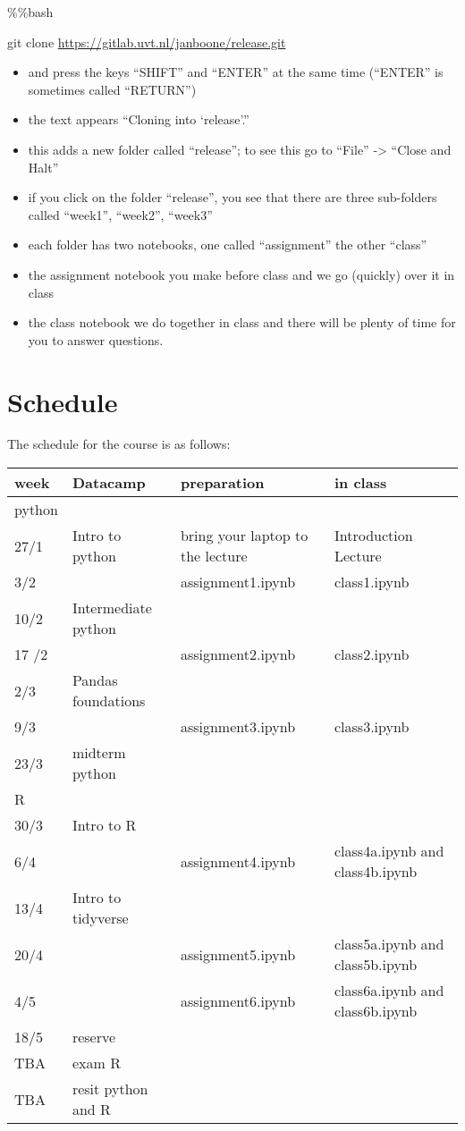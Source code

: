 \documentclass[]{book}
\providecommand{\tightlist}{%
  \setlength{\itemsep}{0pt}\setlength{\parskip}{0pt}}
\begin{document}
\%\%bash

git clone \url{https://gitlab.uvt.nl/janboone/release.git}

\begin{itemize}
\tightlist
\item
  and press the keys ``SHIFT'' and ``ENTER'' at the same time (``ENTER''
  is sometimes called ``RETURN'')
\item
  the text appears ``Cloning into `release'.''
\item
  this adds a new folder called ``release''; to see this go to ``File''
  -\textgreater{} ``Close and Halt''
\item
  if you click on the folder ``release'', you see that there are three
  sub-folders called ``week1'', ``week2'', ``week3''
\item
  each folder has two notebooks, one called ``assignment'' the other
  ``class''
\item
  the assignment notebook you make before class and we go (quickly) over
  it in class
\item
  the class notebook we do together in class and there will be plenty of
  time for you to answer questions.
\end{itemize}

\section{Schedule}\label{schedule-1}

The schedule for the course is as follows:

\begin{longtable}[]{@{}llll@{}}
\toprule
week & Datacamp & preparation & in class\tabularnewline
\midrule
\endhead
python & & &\tabularnewline
27/1 & Intro to python & bring your laptop to the lecture & Introduction
Lecture\tabularnewline
3/2 & & assignment1.ipynb & class1.ipynb\tabularnewline
10/2 & Intermediate python & &\tabularnewline
17 /2 & & assignment2.ipynb & class2.ipynb\tabularnewline
2/3 & Pandas foundations & &\tabularnewline
9/3 & & assignment3.ipynb & class3.ipynb\tabularnewline
23/3 & midterm python & &\tabularnewline
R & & &\tabularnewline
30/3 & Intro to R & &\tabularnewline
6/4 & & assignment4.ipynb & class4a.ipynb and
class4b.ipynb\tabularnewline
13/4 & Intro to tidyverse & &\tabularnewline
20/4 & & assignment5.ipynb & class5a.ipynb and
class5b.ipynb\tabularnewline
4/5 & & assignment6.ipynb & class6a.ipynb and
class6b.ipynb\tabularnewline
18/5 & reserve & &\tabularnewline
TBA & exam R & &\tabularnewline
TBA & resit python and R & &\tabularnewline
\bottomrule
\end{longtable}
\end{document}
